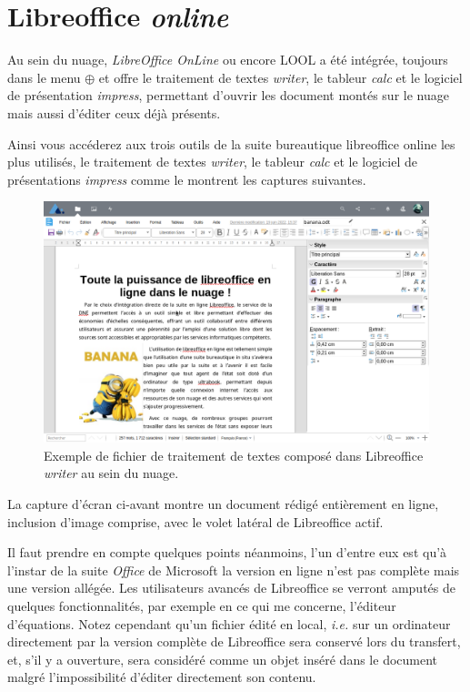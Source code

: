 \section{Libreoffice \emph{online}}

Au sein du nuage, \emph{LibreOffice OnLine\/} ou encore LOOL a été intégrée, toujours dans le menu $\oplus$ et offre le traitement de textes \emph{writer\/}, le tableur \emph{calc\/} et le logiciel de présentation \emph{impress\/}, permettant d'ouvrir les document montés sur le nuage mais aussi d'éditer ceux déjà présents.

Ainsi vous accéderez aux trois outils de la suite bureautique libreoffice online les plus utilisés, le traitement de textes \emph{writer\/}, le tableur \emph{calc\/} et le logiciel de présentations \emph{impress\/} comme le montrent les captures suivantes.

\begin{figure}
    \centering
    \includegraphics[]{Captures/nuage.lool.writer.png}
    \caption{Exemple de fichier de traitement de textes composé dans Libreoffice \emph{writer\/} au sein du nuage.}
\end{figure}

La capture d'écran ci-avant montre un document rédigé entièrement en ligne, inclusion d'image comprise, avec le volet latéral de Libreoffice actif.

Il faut prendre en compte quelques points néanmoins, l'un d'entre eux est qu'à l'instar de la suite \emph{Office\/} de Microsoft\textregistered{} la version en ligne n'est pas complète mais une version allégée. 
Les utilisateurs avancés de Libreoffice se verront amputés de quelques fonctionnalités, par exemple en ce qui me concerne, l'éditeur d'équations.
Notez cependant qu'un fichier édité en local, \emph{i.e.\/} sur un ordinateur directement par la version complète de Libreoffice sera conservé lors du transfert, et, s'il y a ouverture, sera considéré comme un objet inséré dans le document malgré l'impossibilité d'éditer directement son contenu.

